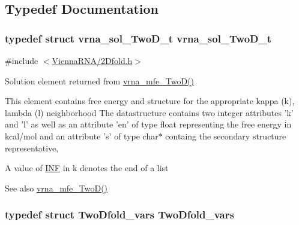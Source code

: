 \subsection{Typedef Documentation}
\hypertarget{group__kl__neighborhood__mfe_ga6a81a58268d250309712549a3fa0aab2}{
\subsubsection[{vrna\+\_\+sol\+\_\+\+Two\+D\+\_\+t}]{\setlength{\rightskip}{0pt plus 5cm}typedef struct {\bf vrna\+\_\+sol\+\_\+\+Two\+D\+\_\+t}  {\bf vrna\+\_\+sol\+\_\+\+Two\+D\+\_\+t}}}\label{group__kl__neighborhood__mfe_ga6a81a58268d250309712549a3fa0aab2}


{\ttfamily \#include $<$\hyperlink{2Dfold_8h}{Vienna\+R\+N\+A/2\+Dfold.\+h}$>$}



Solution element returned from \hyperlink{group__kl__neighborhood__mfe_ga243c288b463147352829df04de6a2f77}{vrna\+\_\+mfe\+\_\+\+Two\+D()} 

This element contains free energy and structure for the appropriate kappa (k), lambda (l) neighborhood The datastructure contains two integer attributes 'k' and 'l' as well as an attribute 'en' of type float representing the free energy in kcal/mol and an attribute 's' of type char$\ast$ containg the secondary structure representative,

A value of \hyperlink{energy__const_8h_a12c2040f25d8e3a7b9e1c2024c618cb6}{I\+N\+F} in k denotes the end of a list

\begin{DoxySeeAlso}{See also}
\hyperlink{group__kl__neighborhood__mfe_ga243c288b463147352829df04de6a2f77}{vrna\+\_\+mfe\+\_\+\+Two\+D()} 
\end{DoxySeeAlso}
\hypertarget{group__kl__neighborhood__mfe_gaf4f514010a14f9d59d850742b3e96954}{
\subsubsection[{Two\+Dfold\+\_\+vars}]{\setlength{\rightskip}{0pt plus 5cm}typedef struct {\bf Two\+Dfold\+\_\+vars}  {\bf Two\+Dfold\+\_\+vars}}}\label{group__kl__neighborhood__mfe_gaf4f514010a14f9d59d850742b3e96954}


